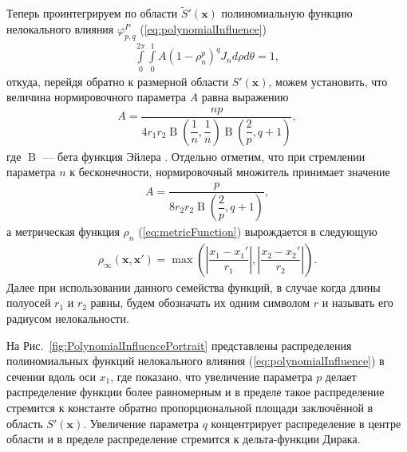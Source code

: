 Теперь проинтегрируем по области $\widetilde{S}' (\boldsymbol{x})$ полиномиальную функцию нелокального влияния $\varphi_{p,q}^{P}$ (\ref{eq:polynomialInfluence})
\begin{gather*}
	\int\limits_0^{2\pi} \int\limits_0^1 A (1 - \rho_n^p)^q J_n d\rho d\theta = 1,
\end{gather*}
откуда, перейдя обратно к размерной области $S'(\boldsymbol{x})$, можем установить, что величина нормировочного параметра $A$ равна выражению
\begin{gather*}
	A = \dfrac{np}
	{
		4 r_1 r_2 
		\operatorname{B}\left( \dfrac{1}{n}, \dfrac{1}{n} \right) 
		\operatorname{B}\left( \dfrac{2}{p}, q+1 \right)
	},
\end{gather*}
где $\operatorname{B}$ --- бета функция Эйлера \cite{SpecialFunction}.
Отдельно отметим, что при стремлении параметра $n$ к бесконечности, нормировочный множитель принимает значение
\begin{gather*}
	A = \dfrac{p}{8 r_2 r_2 \operatorname{B}\left( \dfrac{2}{p}, q+1 \right)},
\end{gather*}
а метрическая функция $\rho_n$ (\ref{eq:metricFunction}) вырождается в следующую
\begin{gather}
	\label{eq:metricFunctionInfinity}
	\rho_{\infty} (\boldsymbol{x}, \boldsymbol{x}') = 
	\max \left( 
		\left| \dfrac{x_1 - x_1'}{r_1} \right|,
		\left| \dfrac{x_2 - x_2'}{r_2} \right|
	\right).
\end{gather}
Далее при использовании данного семейства функций, в случае когда длины полуосей $r_1$ и $r_2$ равны, будем обозначать их одним символом $r$ и называть его радиусом нелокальности.

На Рис.~\ref{fig:PolynomialInfluencePortrait} представлены распределения полиномиальных функций нелокального влияния (\ref{eq:polynomialInfluence}) в сечении вдоль оси $x_1$, где показано, что увеличение параметра $p$ делает распределение функции более равномерным и в пределе такое распределение стремится к константе обратно пропорциональной площади заключённой в область $S'(\boldsymbol{x})$. Увеличение параметра $q$ концентрирует распределение в центре области и в пределе распределение стремится к дельта-функции Дирака.


